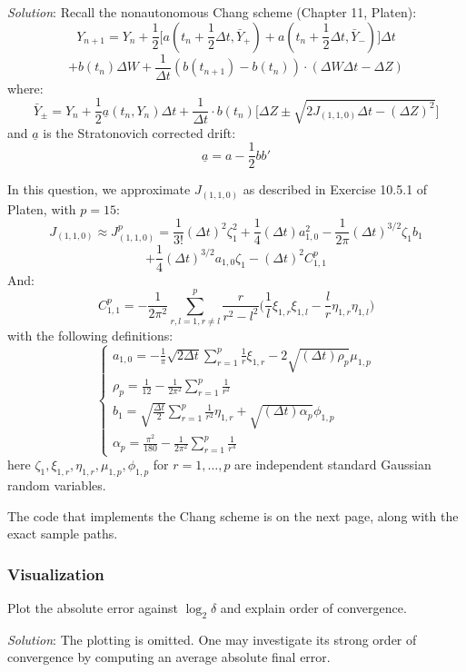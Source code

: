 \documentclass{article}
\begin{document}
\emph{Solution}: Recall the nonautonomous Chang scheme (Chapter 11, Platen):
\begin{equation}\label{eqn:chang-scheme}
    Y_{n+1} = Y_n + \frac12\bigg[
        a(t_n + \frac12\Delta t,\bar{Y}_+) + a(t_n + \frac12\Delta t,\bar{Y}_-)
    \bigg]\Delta t
\end{equation}
$$
    + b(t_n)\Delta W + \frac{1}{\Delta t}(b(t_{n+1}) - b(t_n))\cdot (\Delta W\Delta t - \Delta Z)
$$ where:
$$
    \bar{Y}_{\pm} = Y_n + \frac12\underline{a}(t_n,Y_n)\Delta t + \frac{1}{\Delta t}\cdot b(t_n)\bigg[
        \Delta Z \pm \sqrt{2J_{(1,1,0)}\Delta t - (\Delta Z)^2}
    \bigg]
$$ and $\underline{a}$ is the Stratonovich corrected drift:
$$
    \underline{a} = a - \frac12bb'
$$

In this question, we approximate $J_{(1,1,0)}$ as described in Exercise 10.5.1 of Platen, with $p=15$:
$$
    J_{(1,1,0)} \approx J_{(1,1,0)}^p = \frac{1}{3!}(\Delta t)^2\zeta_1^2+\frac14(\Delta t)a_{1,0}^2 - \frac{1}{2\pi}(\Delta t)^{3/2}\zeta_1b_1 
$$
$$+ \frac14(\Delta t)^{3/2} a_{1,0}\zeta_1 - (\Delta t)^2C_{1,1}^p
$$ And:
$$
    C_{1,1}^p = -\frac{1}{2\pi^2}\sum_{r,l=1,r\neq l}^p\frac{r}{r^2-l^2}\bigg(
        \frac{1}{l}\xi_{1,r}\xi_{1,l} - \frac{l}{r}\eta_{1,r}\eta_{1,l}
    \bigg)
$$ with the following definitions:
$$
    \begin{cases}
        a_{1,0} = -\frac{1}{\pi}\sqrt{2\Delta t}\sum_{r=1}^p\frac{1}{r}\xi_{1,r} - 2\sqrt{(\Delta t)\rho_p}\mu_{1,p}\\
        \rho_p = \frac{1}{12}-\frac{1}{2\pi^2}\sum_{r=1}^p\frac{1}{r^2}\\
        b_1 = \sqrt{\frac{\Delta t}{2}}\sum_{r=1}^p\frac{1}{r^2}\eta_{1,r} + \sqrt{(\Delta t)\alpha_p}\phi_{1,p}\\
        \alpha_p = \frac{\pi^2}{180}-\frac{1}{2\pi^2}\sum_{r=1}^p\frac{1}{r^4}
    \end{cases}
$$ here $\zeta_1, \xi_{1,r}, \eta_{1,r}, \mu_{1,p}, \phi_{1,p}$ for $r=1,\ldots, p$ are independent standard Gaussian random variables.

The code that implements the Chang scheme is on the next page, along with the exact sample paths.

\subsubsection{Visualization} Plot the absolute error against $\log_2\delta$ and explain order of convergence.

\emph{Solution}: The plotting is omitted. One may investigate its strong order of convergence by computing an average absolute final error.
\end{document}
